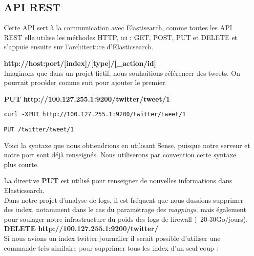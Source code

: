 {\subsection{API REST}
Cette API sert à la communication avec Elastisearch, comme toutes les API REST elle
utilise les méthodes HTTP, ici : GET, POST, PUT et DELETE et s'appuie ensuite sur l'architecture d'Elasticsearch.

\textbf{{\color{grey}http://host:port}/[{\color{red}index}]/[{\color{cyan}type}]/[{\color{yellow}\_action/id}]}\\[4mm]
Imaginons que dans un projet fictif, nous souhaitions référencer des tweets.
On pourrait procéder comme suit pour ajouter le premier.

\textbf{PUT  {\color{grey} http://100.127.255.1:9200}/{\color{red}twitter}/{\color{cyan}tweet}/{\color{yellow}1}}

\begin{lstlisting}[style=code,label={lst:RESTexemple1curl},caption={Avec curl}]
curl -XPUT http://100.127.255.1:9200/twitter/tweet/1
\end{lstlisting}

\begin{lstlisting}[style=code,label={lst:RESTexemple1sense},caption={Avec Sense}]
PUT /twitter/tweet/1
\end{lstlisting}

Voici la syntaxe que nous obtiendrions en utilisant Sense, puisque notre serveur 
et notre port sont déjà renseignés. Nous utiliserons par convention cette syntaxe plus courte.

La directive \textbf{PUT} est utilisé pour renseigner de nouvelles informations dans Elasticsearch.\\[2mm]
Dans notre projet d'analyse de logs, il est fréquent que nous dussions supprimer 
des index, notamment dans le cas du paramétrage des \emph{mappings}, mais également
pour soulager notre infrastructure du poids des logs de firewall (~20-30Go/jours).\\

\textbf{DELETE  {\color{grey} http://100.127.255.1:9200}/{\color{red}twitter}/}\\

Si nous avions un index twitter journalier il serait possible d'utiliser une commande
très similaire pour supprimer tous les index d'un seul coup :\\

}
